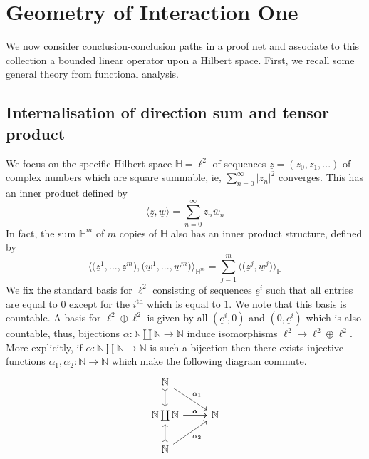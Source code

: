 \documentclass[12pt]{article}
\theoremstyle{plain}
\theoremstyle{definition}
\newcommand{\bb}[1]{\mathbb{#1}}
\newcommand{\lto}{\longrightarrow}
\begin{document}
	\section{Geometry of Interaction One}
	We now consider conclusion-conclusion paths in a proof net and associate to this collection a bounded linear operator upon a Hilbert space. First, we recall some general theory from functional analysis.
	\subsection{Internalisation of direction sum and tensor product}\label{sec:interal_sum_tens}
	We focus on the specific Hilbert space $\bb{H} = \ell^2$ of sequences $\underline{z} = (z_0,z_1,...)$ of complex numbers which are square summable, ie, $\sum_{n = 0}^\infty |z_n|^2$ converges. This has an inner product defined by
	\begin{equation}
		\big\langle \underline{z}, \underline{w}\big\rangle = \sum_{n = 0}^\infty z_n\overline{w}_n
	\end{equation}
	In fact, the sum $\bb{H}^m$ of $m$ copies of $\bb{H}$ also has an inner product structure, defined by
	\begin{equation}\label{eq:bijection}
		\Big\langle \big(\underline{z}^1,...,\underline{z}^m\big),\big(\underline{w}^1,...,\underline{w}^m\big)\Big\rangle_{\bb{H}^m} = \sum_{j = 1}^m\langle \big(\underline{z}^j,\underline{w}^j\big)\rangle_{\bb{H}}
	\end{equation}
	We fix the standard basis for $\ell^2$ consisting of sequences $\underline{e}^i$ such that all entries are equal to $0$ except for the $i^{\operatorname{th}}$ which is equal to $1$. We note that this basis is countable. A basis for $\ell^2 \oplus \ell^2$ is given by all $(\underline{e}^i, 0)$ and $(0,\underline{e}^i)$ which is also countable, thus, bijections $\alpha: \bb{N} \coprod \bb{N} \lto \bb{N}$ induce isomorphisms $\ell^2 \lto \ell^2 \oplus \ell^2$. More explicitly, if $\alpha: \bb{N} \coprod \bb{N} \lto \bb{N}$ is such a bijection then there exists injective functions $\alpha_1,\alpha_2: \bb{N} \lto \bb{N}$ which make the following diagram commute.
	\begin{equation}
		\begin{tikzcd}
			\bb{N}\arrow[dr,"{\alpha_1}"]\arrow[d,rightarrowtail]\\
			\bb{N}\arrow[r,"{\alpha}"] \coprod \bb{N}\arrow[r,"{\alpha}"] & \bb{N}\\
			\bb{N}\arrow[ur,swap,"{\alpha_2}"]\arrow[u,rightarrowtail]
		\end{tikzcd}
	\end{equation}
\end{document}
